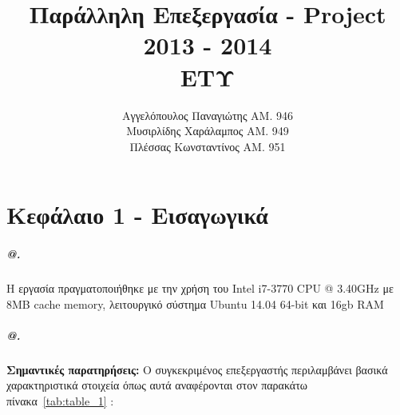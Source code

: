 \documentclass[greek,booktabs,8pt,flagBlueCMYK]{report}
\title{Παράλληλη Επεξεργασία - Project \\ 2013 - 2014 \\ ΕΤΥ}
\author{Αγγελόπουλος Παναγιώτης ΑΜ. 946 \\ Μυσιρλίδης Χαράλαμπος ΑΜ. 949\\ Πλέσσας Κωνσταντίνος ΑΜ. 951}
\date{\parbox{\linewidth}{\centering%
  \today\endgraf\bigskip
  e-mail:\{angelop,mysirlidis,kplessas\}@ceid.upatras.gr \endgraf
  \LaTeX \endgraf}}
\begin{document}
\maketitle

\makeatletter
\renewcommand{\@makechapterhead}[1]{%
  \vspace*{50\p@}%
  {\parindent \z@ \raggedright \normalfont
  \hrule                                        %
  \vspace{5pt}%
  \interlinepenalty\@M
  \Huge \scshape #1\par                         %
  \vspace{5pt}%
  \hrule                                        %
  \nobreak
  \vskip 40\p@
  }
}
\makeatother

\makeatletter
\newcommand*{\rom}[1]{\expandafter\@slowromancap\romannumeral #1@}
\makeatother

\tableofcontents
\large
\chapter{Κεφάλαιο 1 - Εισαγωγικά}
\paragraph{\rom{1}.} Η εργασία πραγματοποιήθηκε με την χρήση του Intel i7-3770 CPU @ 3.40GHz με 8MB cache memory, λειτουργικό σύστημα Ubuntu 14.04 64-bit και 16gb RAM\newline

\paragraph{\rom{2}.}\textbf{Σημαντικές παρατηρήσεις:}\newline
Ο συγκεκριμένος επεξεργαστής περιλαμβάνει βασικά χαρακτηριστικά στοιχεία όπως αυτά αναφέρονται στον παρακάτω πίνακα~\ref{tab:table_1} : \newline 
\end{document}
